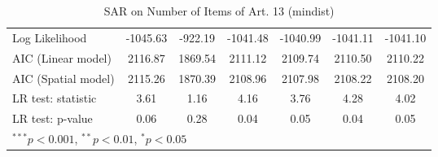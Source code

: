 \begin{table}[!h]
\begin{center}
\begin{tabular}{l c c c c c c }
Log Likelihood          & -1045.63    & -922.19    & -1041.48    & -1040.99    & -1041.11    & -1041.10    \\
AIC (Linear model)      & 2116.87     & 1869.54    & 2111.12     & 2109.74     & 2110.50     & 2110.22     \\
AIC (Spatial model)     & 2115.26     & 1870.39    & 2108.96     & 2107.98     & 2108.22     & 2108.20     \\
LR test: statistic      & 3.61        & 1.16       & 4.16        & 3.76        & 4.28        & 4.02        \\
LR test: p-value        & 0.06        & 0.28       & 0.04        & 0.05        & 0.04        & 0.05        \\
\bottomrule
\multicolumn{7}{l}{\scriptsize{$^{***}p<0.001$, $^{**}p<0.01$, $^*p<0.05$}}
\end{tabular}
\caption{SAR on Number of Items of Art. 13 (mindist)}
\label{table:coefficients}
\end{center}
\end{table}

